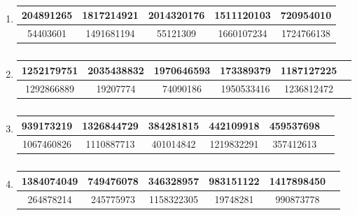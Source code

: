 \documentclass[oneside,final,14pt]{extreport}
\begin{document}
\begin{large}
\begin{enumerate}
\item 
\begin{table}[H]
	\centering
\begin{tabular}{|c|c|c|c|c|}
	\hline
	204891265  & 1817214921 &  2014320176 &  1511120103  & 720954010 \\ \hline
	  54403601  & 1491681194 &  55121309  & 1660107234 &  1724766138 \\ \hline   
\end{tabular}
\caption{}
\label{t:65}
\end{table}
	\item 
	\begin{table}[H]
		\centering
	\begin{tabular}{|c|c|c|c|c|c}
		\hline
		1252179751  & 2035438832 &  1970646593 &  173389379 &  1187127225  \\ \hline
		 1292866889 & 19207774  & 74090186 &  1950533416 &  1236812472 \\ \hline   
	\end{tabular}
	\caption{}
	\label{t:66}
	\end{table}
 \item
 \begin{table}[H]
	\centering
\begin{tabular}{|c|c|c|c|c|c}
	\hline
	939173219 & 1326844729 &  384281815 &  442109918  & 459537698  \\ \hline
	1067460826 & 1110887713 &  401014842  & 1219832291 &  357412613   \\ \hline   
\end{tabular}
\caption{}
\label{t:67}
\end{table}
\item
\begin{table}[H]
	\centering
\begin{tabular}{|c|c|c|c|c|c}
	\hline
	1384074049  & 749476078 &  346328957 &  983151122 &  1417898450  \\ \hline 
	264878214  & 245775973 &  1158322305  & 19748281  & 990873778  \\ \hline   
\end{tabular}
\caption{}
\label{t:68}
\end{table}
\end{enumerate}


\end{large}
\end{document}
